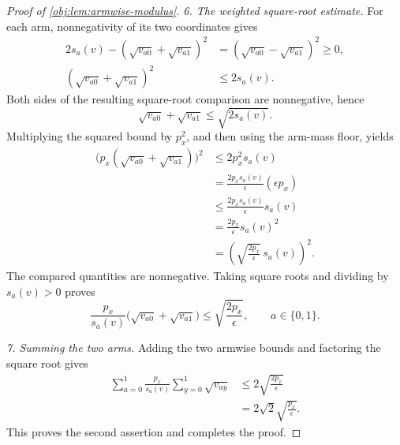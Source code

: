 \begin{proof}[Proof of \cref{obj:lem:armwise-modulus}]
\emph{6. The weighted square-root estimate.}
For each arm, nonnegativity of its two coordinates gives
\[
\begin{aligned}
2s_a(v)-(\sqrt{v_{a0}}+\sqrt{v_{a1}})^2
&=(\sqrt{v_{a0}}-\sqrt{v_{a1}})^2\geq0,\\
(\sqrt{v_{a0}}+\sqrt{v_{a1}})^2
&\leq2s_a(v).
\end{aligned}
\]
Both sides of the resulting square-root comparison are nonnegative, hence
\[
\sqrt{v_{a0}}+\sqrt{v_{a1}}\leq\sqrt{2s_a(v)}.
\]
Multiplying the squared bound by \(p_x^2\), and then using the arm-mass floor, yields
\[
\begin{aligned}
\bigl(p_x(\sqrt{v_{a0}}+\sqrt{v_{a1}})\bigr)^2
&\leq2p_x^2s_a(v)\\
&=\frac{2p_xs_a(v)}{\epsilon}(\epsilon p_x)\\
&\leq\frac{2p_xs_a(v)}{\epsilon}s_a(v)\\
&=\frac{2p_x}{\epsilon}s_a(v)^2\\
&=\left(\sqrt{\frac{2p_x}{\epsilon}}\,s_a(v)\right)^2.
\end{aligned}
\]
The compared quantities are nonnegative. Taking square roots and dividing by \(s_a(v)>0\) proves
\[
\frac{p_x}{s_a(v)}
\bigl(\sqrt{v_{a0}}+\sqrt{v_{a1}}\bigr)
\leq\sqrt{\frac{2p_x}{\epsilon}},
\qquad a\in\{0,1\}.
\]

\emph{7. Summing the two arms.}
Adding the two armwise bounds and factoring the square root gives
\[
\begin{aligned}
\sum_{a=0}^1\frac{p_x}{s_a(v)}
\sum_{y=0}^1\sqrt{v_{ay}}
&\leq2\sqrt{\frac{2p_x}{\epsilon}}\\
&=2\sqrt{2}\sqrt{\frac{p_x}{\epsilon}}.
\end{aligned}
\]
This proves the second assertion and completes the proof.
\end{proof}
